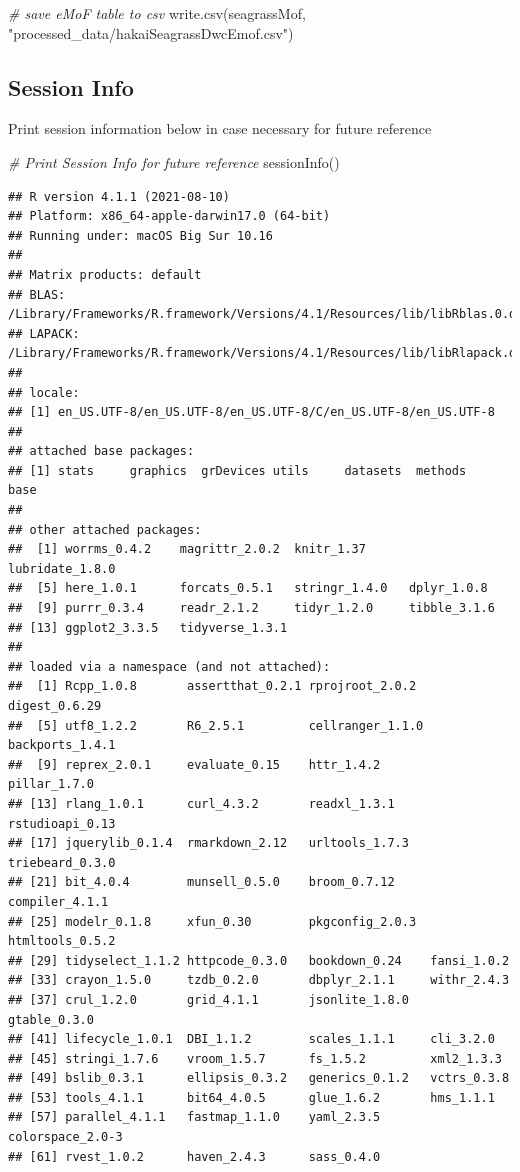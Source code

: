 \documentclass[
]{book}
\newenvironment{Shaded}{\begin{snugshade}}{\end{snugshade}}
\newcommand{\CommentTok}[1]{\textcolor[rgb]{0.56,0.35,0.01}{\textit{#1}}}
\newcommand{\FunctionTok}[1]{\textcolor[rgb]{0.00,0.00,0.00}{#1}}
\newcommand{\NormalTok}[1]{#1}
\newcommand{\StringTok}[1]{\textcolor[rgb]{0.31,0.60,0.02}{#1}}
\begin{document}
\begin{Shaded}
\begin{Highlighting}[]
\CommentTok{\# save eMoF table to csv}
\FunctionTok{write.csv}\NormalTok{(seagrassMof, }\StringTok{"processed\_data/hakaiSeagrassDwcEmof.csv"}\NormalTok{)}
\end{Highlighting}
\end{Shaded}

\hypertarget{session-info}{%
\subsection{Session Info}\label{session-info}}

Print session information below in case necessary for future reference

\begin{Shaded}
\begin{Highlighting}[]
\CommentTok{\# Print Session Info for future reference}
\FunctionTok{sessionInfo}\NormalTok{()}
\end{Highlighting}
\end{Shaded}

\begin{verbatim}
## R version 4.1.1 (2021-08-10)
## Platform: x86_64-apple-darwin17.0 (64-bit)
## Running under: macOS Big Sur 10.16
## 
## Matrix products: default
## BLAS:   /Library/Frameworks/R.framework/Versions/4.1/Resources/lib/libRblas.0.dylib
## LAPACK: /Library/Frameworks/R.framework/Versions/4.1/Resources/lib/libRlapack.dylib
## 
## locale:
## [1] en_US.UTF-8/en_US.UTF-8/en_US.UTF-8/C/en_US.UTF-8/en_US.UTF-8
## 
## attached base packages:
## [1] stats     graphics  grDevices utils     datasets  methods   base     
## 
## other attached packages:
##  [1] worrms_0.4.2    magrittr_2.0.2  knitr_1.37      lubridate_1.8.0
##  [5] here_1.0.1      forcats_0.5.1   stringr_1.4.0   dplyr_1.0.8    
##  [9] purrr_0.3.4     readr_2.1.2     tidyr_1.2.0     tibble_3.1.6   
## [13] ggplot2_3.3.5   tidyverse_1.3.1
## 
## loaded via a namespace (and not attached):
##  [1] Rcpp_1.0.8       assertthat_0.2.1 rprojroot_2.0.2  digest_0.6.29   
##  [5] utf8_1.2.2       R6_2.5.1         cellranger_1.1.0 backports_1.4.1 
##  [9] reprex_2.0.1     evaluate_0.15    httr_1.4.2       pillar_1.7.0    
## [13] rlang_1.0.1      curl_4.3.2       readxl_1.3.1     rstudioapi_0.13 
## [17] jquerylib_0.1.4  rmarkdown_2.12   urltools_1.7.3   triebeard_0.3.0 
## [21] bit_4.0.4        munsell_0.5.0    broom_0.7.12     compiler_4.1.1  
## [25] modelr_0.1.8     xfun_0.30        pkgconfig_2.0.3  htmltools_0.5.2 
## [29] tidyselect_1.1.2 httpcode_0.3.0   bookdown_0.24    fansi_1.0.2     
## [33] crayon_1.5.0     tzdb_0.2.0       dbplyr_2.1.1     withr_2.4.3     
## [37] crul_1.2.0       grid_4.1.1       jsonlite_1.8.0   gtable_0.3.0    
## [41] lifecycle_1.0.1  DBI_1.1.2        scales_1.1.1     cli_3.2.0       
## [45] stringi_1.7.6    vroom_1.5.7      fs_1.5.2         xml2_1.3.3      
## [49] bslib_0.3.1      ellipsis_0.3.2   generics_0.1.2   vctrs_0.3.8     
## [53] tools_4.1.1      bit64_4.0.5      glue_1.6.2       hms_1.1.1       
## [57] parallel_4.1.1   fastmap_1.1.0    yaml_2.3.5       colorspace_2.0-3
## [61] rvest_1.0.2      haven_2.4.3      sass_0.4.0
\end{verbatim}
\end{document}
